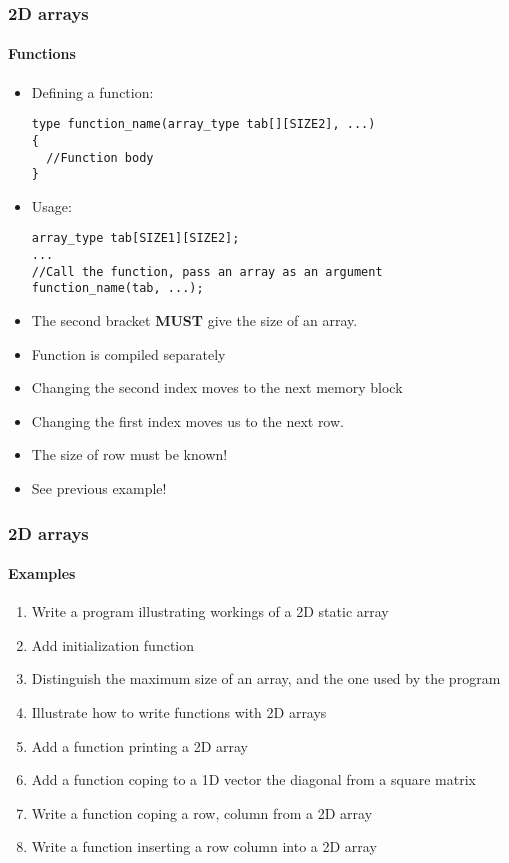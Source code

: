 \documentclass[10pt]{beamer}
\begin{document}
\begin{frame}[fragile]
  \frametitle{2D arrays}
  \framesubtitle{Functions}
  \begin{itemize}
    \item Defining a function:
\begin{lstlisting}
type function_name(array_type tab[][SIZE2], ...)
{
  //Function body
}
\end{lstlisting}
\item Usage:
\begin{lstlisting}
array_type tab[SIZE1][SIZE2];
...
//Call the function, pass an array as an argument
function_name(tab, ...); 
\end{lstlisting}
  
\item The second bracket \textbf{MUST} give the size of an array.
\item Function is compiled separately
\item Changing the second index moves to the next memory block
\item Changing the first index moves us to the next row.
\item The size of row must be known!
\item See previous example!
\end{itemize}

\end{frame}

\begin{frame}[fragile]
  \frametitle{2D arrays}
  \framesubtitle{Examples}

\begin{enumerate}
	\item Write a program illustrating workings of a 2D static array
	\item Add initialization function
	\item Distinguish the maximum size of an array, and the one used by the program
	\item Illustrate how to write functions with 2D arrays
	\item Add a function printing a 2D array
	\item Add a function coping to a 1D vector the diagonal from a square matrix
	\item Write a function coping a row, column from a 2D array
	\item Write a function inserting a row column into a 2D array
\end{enumerate}

\end{frame}
\end{document}
